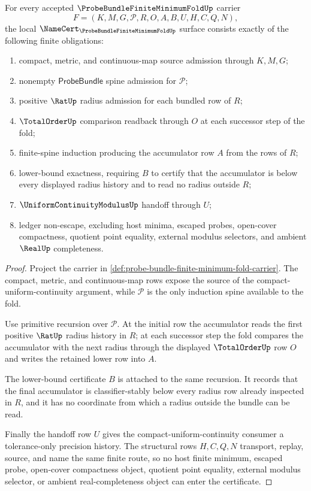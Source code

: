 \begin{theorem}
\label{thm:probe-bundle-finite-minimum-fold-namecert-obligations}
For every accepted $\ProbeBundleFiniteMinimumFoldUp$ carrier
$$
F=(K,M,G,\mathcal{P},R,O,A,B,U,H,C,Q,N),
$$
the local $\NameCert_{\ProbeBundleFiniteMinimumFoldUp}$ surface consists exactly of the following finite obligations:
\begin{enumerate}
\item compact, metric, and continuous-map source admission through $K,M,G$;
\item nonempty $\mathsf{ProbeBundle}$ spine admission for $\mathcal{P}$;
\item positive $\RatUp$ radius admission for each bundled row of $R$;
\item $\TotalOrderUp$ comparison readback through $O$ at each successor step of the fold;
\item finite-spine induction producing the accumulator row $A$ from the rows of $R$;
\item lower-bound exactness, requiring $B$ to certify that the accumulator is below every displayed radius history and to read no radius outside $R$;
\item $\UniformContinuityModulusUp$ handoff through $U$;
\item ledger non-escape, excluding host minima, escaped probes, open-cover compactness, quotient point equality, external modulus selectors, and ambient $\RealUp$ completeness.
\end{enumerate}
\end{theorem}
\begin{proof}
Project the carrier in \autoref{def:probe-bundle-finite-minimum-fold-carrier}. The compact, metric, and continuous-map rows expose the source of the compact-uniform-continuity argument, while $\mathcal{P}$ is the only induction spine available to the fold.

Use primitive recursion over $\mathcal{P}$. At the initial row the accumulator reads the first positive $\RatUp$ radius history in $R$; at each successor step the fold compares the accumulator with the next radius through the displayed $\TotalOrderUp$ row $O$ and writes the retained lower row into $A$.

The lower-bound certificate $B$ is attached to the same recursion. It records that the final accumulator is classifier-stably below every radius row already inspected in $R$, and it has no coordinate from which a radius outside the bundle can be read.

Finally the handoff row $U$ gives the compact-uniform-continuity consumer a tolerance-only precision history. The structural rows $H,C,Q,N$ transport, replay, source, and name the same finite route, so no host finite minimum, escaped probe, open-cover compactness object, quotient point equality, external modulus selector, or ambient real-completeness object can enter the certificate.
\end{proof}

